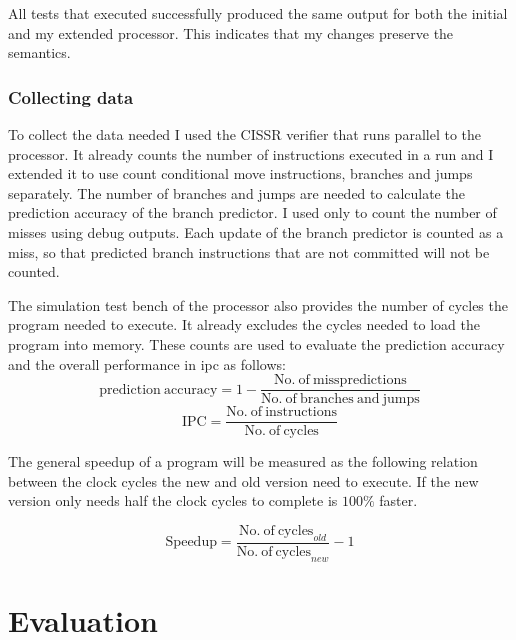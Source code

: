 \documentclass[12pt,twoside,notitlepage]{report}
\begin{document}
All tests that executed successfully produced the same output for both the initial and my extended processor. This indicates that my changes preserve the semantics.


\subsection{Collecting data}

To collect the data needed I used the CISSR verifier that runs parallel to the processor. It already counts the number of instructions executed in a run and I extended it to use count conditional move instructions, branches and jumps separately. The number of branches and jumps are needed to calculate the prediction accuracy of the branch predictor. I used only to count the number of misses using debug outputs. Each update of the branch predictor is counted as a miss, so that predicted branch instructions that are not committed will not be counted.

The simulation test bench of the processor also provides the number of cycles the program needed to execute. It already excludes the cycles needed to load the program into memory. These counts are used to evaluate the prediction accuracy and the overall performance in \gls{ipc} as follows:
\begin{equation}
\mathrm{prediction ~accuracy} = 1- \frac{\mathrm{No.~ of~ misspredictions}}{\mathrm{No. ~of ~branches ~and ~jumps}}
\end{equation}
\begin{equation}
\mathrm{IPC} =\frac{\mathrm{No.~ of~ instructions}}{\mathrm{No. ~ of ~cycles}}
\end{equation}

The general speedup of a program will be measured as the following relation between the clock cycles the new and old version need to execute. If the new version only needs half the clock cycles to complete is $100\%$ faster.

\begin{equation}
\mathrm{Speedup} =\frac{\mathrm{No. ~ of ~cycles}_{old}}{\mathrm{No. ~ of ~cycles}_{new}} - 1
\end{equation}




\cleardoublepage
\chapter{Evaluation}
\end{document}
